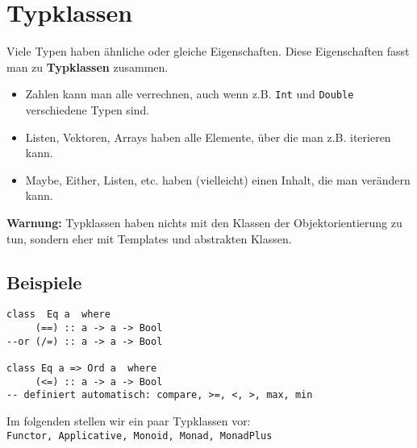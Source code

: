 \documentclass{beamer}
\begin{document}
\section{Typklassen}
\begin{frame}
Viele Typen haben ähnliche oder gleiche Eigenschaften. Diese Eigenschaften fasst man zu \textbf{Typklassen} zusammen.\\
\pause
\begin{itemize}
 \item Zahlen kann man alle verrechnen, auch wenn z.B. \texttt{Int} und \texttt{Double} verschiedene Typen sind.
 \item Listen, Vektoren, Arrays haben alle Elemente, über die man z.B. iterieren kann.
 \item Maybe, Either, Listen, etc. haben (vielleicht) einen Inhalt, die man verändern kann.
\end{itemize}
\pause
\begin{important}
\textbf{Warnung:} Typklassen haben nichts mit den Klassen der Objektorientierung zu tun, sondern eher mit Templates und abstrakten Klassen.
\end{important}
\end{frame}

\subsection{Beispiele}
\begin{frame}[fragile]
\begin{verbatim}
class  Eq a  where
     (==) :: a -> a -> Bool
--or (/=) :: a -> a -> Bool

class Eq a => Ord a  where
     (<=) :: a -> a -> Bool
-- definiert automatisch: compare, >=, <, >, max, min
\end{verbatim}
\pause
\bigskip

Im folgenden stellen wir ein paar Typklassen vor:\\
\texttt{Functor, Applicative, Monoid, Monad, MonadPlus}
\end{frame}

\end{document}
